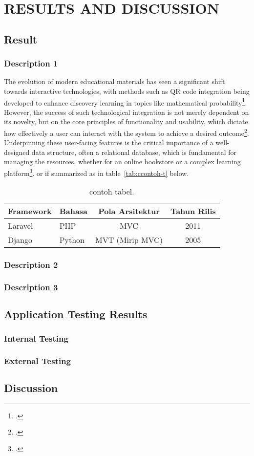 \chapter{RESULTS AND DISCUSSION}
	\section{Result}
		\subsection{Description 1}
		The evolution of modern educational materials has seen a significant shift towards interactive technologies, with methods such as QR code integration being developed to enhance discovery learning in topics like mathematical probability\footcite{ramadhan2024}. However, the success of such technological integration is not merely dependent on its novelty, but on the core principles of functionality and usability, which dictate how effectively a user can interact with the system to achieve a desired outcome\footcite{goodwin1987}. Underpinning these user-facing features is the critical importance of a well-designed data structure, often a relational database, which is fundamental for managing the resources, whether for an online bookstore or a complex learning platform\footcite{alhusain2016}.
		or if summarized as in table~\ref{tab:ccontoh-t} below.
		
		\begin{table}[h!]
		\centering
		\caption{contoh tabel.}
		\label{tab:contoh-t}
			\begin{tabular}{llcc}
				\toprule
				\textbf{Framework} & \textbf{Bahasa} & \textbf{Pola Arsitektur} & \textbf{Tahun Rilis} \\
				\midrule
				Laravel & PHP & MVC & 2011 \\
				Django & Python & MVT (Mirip MVC) & 2005 \\
				\bottomrule
			\end{tabular}
		\end{table}
		
		\subsection{Description 2}
		\lipsum[1]
		
		\subsection{Description 3}
		\lipsum[1]
		
	\section{Application Testing Results}
		
		\subsection{Internal Testing}
		\lipsum[2]
		
		\subsection{External Testing}
		\lipsum[2]
	
	\section{Discussion}
		\lipsum[2]